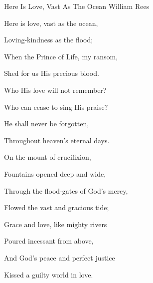 \documentclass[12pt]{book}
\begin{document}
\begin{song}{Here Is Love, Vast As The Ocean}{}
  {\SBPubDom}
  {William Rees}
  {}
  {}

  \begin{SBVerse}
    Here is love, vast as the ocean,

    Loving-kindness as the flood;

    When the Prince of Life, my ransom,

    Shed for us His precious blood.

    Who His love will not remember?

    Who can cease to sing His praise?

    He shall never be forgotten,

    Throughout heaven's eternal days.
  \end{SBVerse}

  \begin{SBVerse}
    On the mount of crucifixion,

    Fountains opened deep and wide,

    Through the flood-gates of God's mercy,

    Flowed the vast and gracious tide;

    Grace and love, like mighty rivers

    Poured incessant from above,

    And God's peace and perfect justice

    Kissed a guilty world in love.
  \end{SBVerse}

\end{song}
\end{document}

